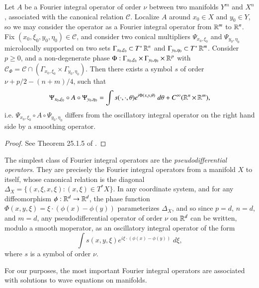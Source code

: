 \begin{theorem} \label{thm:equivalenceofphase}
  Let $A$ be a Fourier integral operator of order $\nu$ between two manifolds $Y^m$ and $X^n$, associated with the canonical relation $\mathcal{C}$. Localize $A$ around $x_0 \in X$ and $y_0 \in Y$, so we may consider the operator as a Fourier integral operator from $\operatorname{\mathbb{R}}^m$ to $\operatorname{\mathbb{R}}^n$. Fix $(x_0,\xi_0,y_0,\eta_0) \in \mathcal{C}$, and consider two conical multipliers $\Psi_{x_0,\xi_0}$ and $\Psi_{y_0,\eta_0}$ microlocally supported on two sets $\Gamma_{x_0,\xi_0} \subset T^* \operatorname{\mathbb{R}}^n$ and $\Gamma_{y_0,\eta_0} \subset T^* \operatorname{\mathbb{R}}^m$. Consider $p \geq 0$, and a non-degenerate phase $\Phi: \Gamma_{x_0,\xi_0} \times \Gamma_{y_0,\eta_0} \times \operatorname{\mathbb{R}}^p$ with $\mathcal{C}_\Phi = \mathcal{C} \cap (\Gamma_{x_0,\xi_0} \times \Gamma_{y_0,\eta_0})$. Then there exists a symbol $s$ of order $\nu + p/2 - (n+m)/4$, such that
  \[ \Psi_{x_0,\xi_0} \circ A \circ \Psi_{y_0,\eta_0} = \int s(\cdot,\cdot,\theta) e^{i \Phi(x,y,\theta)}\; d\theta + C^\infty(\operatorname{\mathbb{R}}^n \times \operatorname{\mathbb{R}}^m), \]
  i.e. $\Psi_{x_0,\xi_0} \circ A \circ \Psi_{y_0,\eta_0}$ differs from the oscillatory integral operator on the right hand side by a smoothing operator.
\end{theorem}
\begin{proof}
  See Theorem 25.1.5 of \cite{Hormander4}.
\end{proof}

The simplest class of Fourier integral operators are the \emph{pseudodifferential operators}. They are precisely the Fourier integral operators from a manifold $X$ to itself, whose canonical relation is the diagonal $\Delta_X = \{ (x,\xi,x,\xi): (x,\xi) \in T^* X \}$. In any coordinate system, and for any diffeomorphism $\phi: \operatorname{\mathbb{R}}^d \to \operatorname{\mathbb{R}}^d$, the phase function $\Phi(x,y,\xi) = \xi \cdot (\phi(x) - \phi(y))$ parameterizes $\Delta_X$, and so since $p = d$, $n = d$, and $m = d$, any pseudodifferential operator of order $\nu$ on $\operatorname{\mathbb{R}}^d$ can be written, modulo a smooth moperator, as an oscillatory integral operator of the form
%
\begin{equation}
  \int s(x,y,\xi) e^{i \xi \cdot (\phi(x) - \phi(y))}\; d\xi,
\end{equation}
%
where $s$ is a symbol of order $\nu$.

For our purposes, the most important Fourier integral operators are associated with solutions to wave equations on manifolds.

